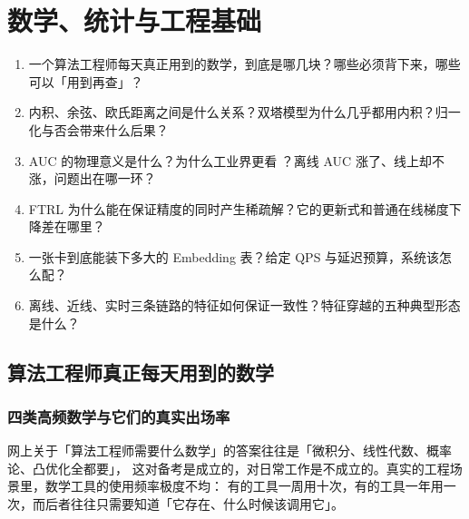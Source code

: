 \chapter{数学、统计与工程基础}
\label{ch:math}

\begin{insight}[本章要解决的问题]
\begin{enumerate}
  \item 一个算法工程师每天真正用到的数学，到底是哪几块？哪些必须背下来，哪些可以「用到再查」？
  \item 内积、余弦、欧氏距离之间是什么关系？双塔模型为什么几乎都用内积？归一化与否会带来什么后果？
  \item AUC 的物理意义是什么？为什么工业界更看 ？离线 AUC 涨了、线上却不涨，问题出在哪一环？
  \item FTRL 为什么能在保证精度的同时产生稀疏解？它的更新式和普通在线梯度下降差在哪里？
  \item 一张卡到底能装下多大的 Embedding 表？给定 QPS 与延迟预算，系统该怎么配？
  \item 离线、近线、实时三条链路的特征如何保证一致性？特征穿越的五种典型形态是什么？
\end{enumerate}
\end{insight}

\section{算法工程师真正每天用到的数学}

\subsection{四类高频数学与它们的真实出场率}

网上关于「算法工程师需要什么数学」的答案往往是「微积分、线性代数、概率论、凸优化全都要」，
这对备考是成立的，对日常工作是不成立的。真实的工程场景里，数学工具的使用频率极度不均：
有的工具一周用十次，有的工具一年用一次，而后者往往只需要知道「它存在、什么时候该调用它」。

